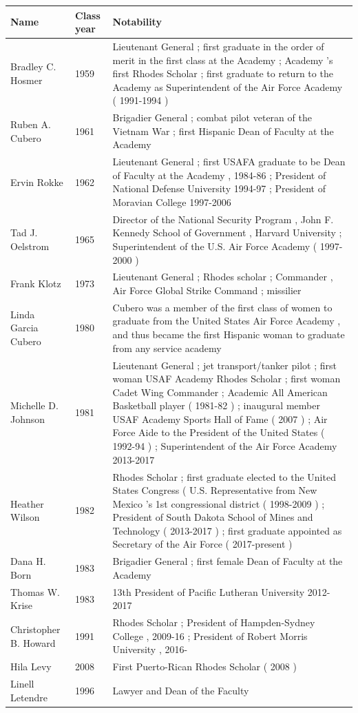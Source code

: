 \documentclass{article}
\begin{document}
\begin{tabular}{lll}
\toprule
Name & Class year & Notability \\
\midrule
Bradley C. Hosmer & 1959 & Lieutenant General ; first graduate in the order of merit in the first class at the Academy ; Academy 's first Rhodes Scholar ; first graduate to return to the Academy as Superintendent of the Air Force Academy ( 1991-1994 ) \\
Ruben A. Cubero & 1961 & Brigadier General ; combat pilot veteran of the Vietnam War ; first Hispanic Dean of Faculty at the Academy \\
Ervin Rokke & 1962 & Lieutenant General ; first USAFA graduate to be Dean of Faculty at the Academy , 1984-86 ; President of National Defense University 1994-97 ; President of Moravian College 1997-2006 \\
Tad J. Oelstrom & 1965 & Director of the National Security Program , John F. Kennedy School of Government , Harvard University ; Superintendent of the U.S. Air Force Academy ( 1997-2000 ) \\
Frank Klotz & 1973 & Lieutenant General ; Rhodes scholar ; Commander , Air Force Global Strike Command ; missilier \\
Linda Garcia Cubero & 1980 & Cubero was a member of the first class of women to graduate from the United States Air Force Academy , and thus became the first Hispanic woman to graduate from any service academy \\
Michelle D. Johnson & 1981 & Lieutenant General ; jet transport/tanker pilot ; first woman USAF Academy Rhodes Scholar ; first woman Cadet Wing Commander ; Academic All American Basketball player ( 1981-82 ) ; inaugural member USAF Academy Sports Hall of Fame ( 2007 ) ; Air Force Aide to the President of the United States ( 1992-94 ) ; Superintendent of the Air Force Academy 2013-2017 \\
Heather Wilson & 1982 & Rhodes Scholar ; first graduate elected to the United States Congress ( U.S. Representative from New Mexico 's 1st congressional district ( 1998-2009 ) ; President of South Dakota School of Mines and Technology ( 2013-2017 ) ; first graduate appointed as Secretary of the Air Force ( 2017-present ) \\
Dana H. Born & 1983 & Brigadier General ; first female Dean of Faculty at the Academy \\
Thomas W. Krise & 1983 & 13th President of Pacific Lutheran University 2012-2017 \\
Christopher B. Howard & 1991 & Rhodes Scholar ; President of Hampden-Sydney College , 2009-16 ; President of Robert Morris University , 2016- \\
Hila Levy & 2008 & First Puerto-Rican Rhodes Scholar ( 2008 ) \\
Linell Letendre & 1996 & Lawyer and Dean of the Faculty \\
\bottomrule
\end{tabular}
\end{document}
